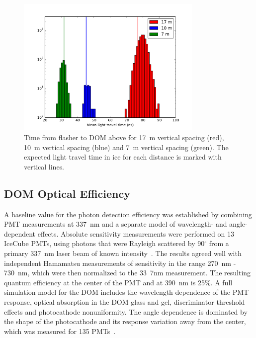 \begin{figure}[!h]
  \captionsetup[subfigure]{labelformat=empty}
  \centering
  \includegraphics[width=0.8\textwidth]{graphics/dom/rapcal/flashmean.pdf}
  \caption{Time from flasher to DOM above for 17~m vertical spacing
    (red), 10~m vertical spacing (blue) and 7~m vertical spacing
    (green). The expected light travel time in ice for each distance is marked with
    vertical lines.}
  \label{fig:flashertiming}
\end{figure}

\subsection{\label{sec:domeff} DOM Optical Efficiency}

A baseline value for the photon detection efficiency was established
by combining PMT measurements at 337~nm and a separate model of
wavelength- and angle-dependent effects.  Absolute sensitivity
measurements were performed on 13 IceCube PMTs, using photons that
were Rayleigh scattered by 90$^{\circ}$  from a primary 337~nm laser
beam of known intensity~\cite{ICECUBE:PMT}. The results agreed well
with independent Hamamatsu measurements of sensitivity in the range
270~nm - 730~nm, which were then normalized to the 33~7nm measurement.  The resulting quantum efficiency at the center of the PMT and at 390~nm is 25\%.  A full simulation model for the DOM includes the wavelength dependence of the PMT response, optical absorption in the DOM glass and gel, discriminator threshold effects and photocathode nonuniformity.   The angle dependence is dominated by the shape of the photocathode and its response variation away from the center, which was measured for 135 PMTs~\cite{ICECUBE:PMT}.   


